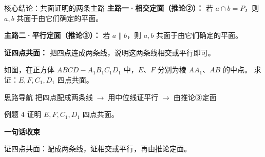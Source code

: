 \documentclass{exam-zh}
\begin{document}
\clearpage
{}


\begin{eduSolutionBox}{核心结论：共面证明的两条主路}
  \begingroup
  \setlength{\parskip}{2.5mm}
\textbf{主路一·相交定面（推论②）：} 若 $a\cap b=P$，则 $a,b$ 共面于由它们确定的平面。\par
\textbf{主路二·平行定面（推论③）：} 若 $a\parallel b$，则 $a,b$ 共面于由它们确定的平面。\par
\textbf{证四点共面：} 把四点连成两条线，说明这两条线相交或平行即可。\par
  \endgroup
\end{eduSolutionBox}




\begin{eduProblemBlock}[例题 4]
如图，在正方体 $ABCD-A_1B_1C_1D_1$ 中，$E$、$F$ 分别为棱 $AA_1$、$AB$ 的中点。
求证：$E,F,C_1,D_1$ 四点共面。

\end{eduProblemBlock}





\begin{eduAuxItem}{思路导航}
把四点配成两条线$\;\to\;$用中位线证平行$\;\to\;$由推论③定面\end{eduAuxItem}




\begin{eduSubQuestionItem}{例题 4}
证明 $E,F,C_1,D_1$ 四点共面。\end{eduSubQuestionItem}

\begin{eduDualExplain}
  \begin{eduExplainLeft}
  \end{eduExplainLeft}

  \begin{eduExplainRight}
    \vspace{1mm}
    {\color{edu-blue}\bfseries\small 一句话收束}\par\vspace{1mm}
    \begin{eduBulletList}
      \item 证四点共面：配成两条线，证相交或平行，再由推论定面。    \end{eduBulletList}
  \end{eduExplainRight}
\end{eduDualExplain}
\end{document}
